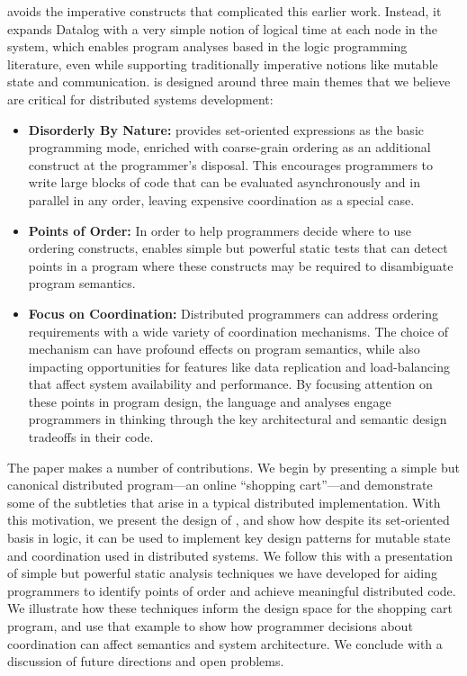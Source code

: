 \lang avoids the imperative constructs that complicated this earlier work.  Instead, it expands Datalog with a very simple notion of logical time at each node in the system, which enables program analyses based in the logic programming literature, even while supporting traditionally imperative notions like mutable state and communication.  \lang is designed around three main themes that we believe are critical for distributed systems development:
\begin{itemize}
    \item {\bf Disorderly By Nature:} \lang provides set-oriented expressions as the basic programming mode, enriched with coarse-grain ordering as an additional construct at the programmer's disposal.  This encourages programmers to write large blocks of code that can be evaluated asynchronously and in parallel in any order, leaving expensive coordination as a special case.
    \item {\bf Points of Order:} In order to help programmers decide where to use ordering constructs, \lang enables simple but powerful static tests that can detect points in a program where these constructs may be required to disambiguate program semantics. 
    \item {\bf Focus on Coordination:} Distributed programmers can address ordering requirements with a wide variety of coordination mechanisms. The choice of mechanism can have profound effects on program semantics, while also impacting opportunities for features like data replication and load-balancing that affect system availability and performance.  By focusing attention on these points in program design, the language and analyses engage programmers in thinking through the key architectural and semantic design tradeoffs in their code.
\end{itemize}

The paper makes a number of contributions.  We begin by presenting a simple but canonical distributed program---an online ``shopping cart''---and demonstrate some of the subtleties that arise in a typical distributed implementation.  With this motivation, we present the design of \lang, and show how despite its set-oriented basis in logic, it can be used to implement key design patterns for mutable state and coordination used in distributed systems.  We follow this with a presentation of simple but powerful static analysis techniques we have developed for aiding programmers to identify points of order and achieve meaningful  distributed code.  We illustrate how these techniques inform the design space for the shopping cart program, and use that example to show how programmer decisions about coordination can affect semantics and system architecture.  We conclude with a discussion of future directions and open problems.
